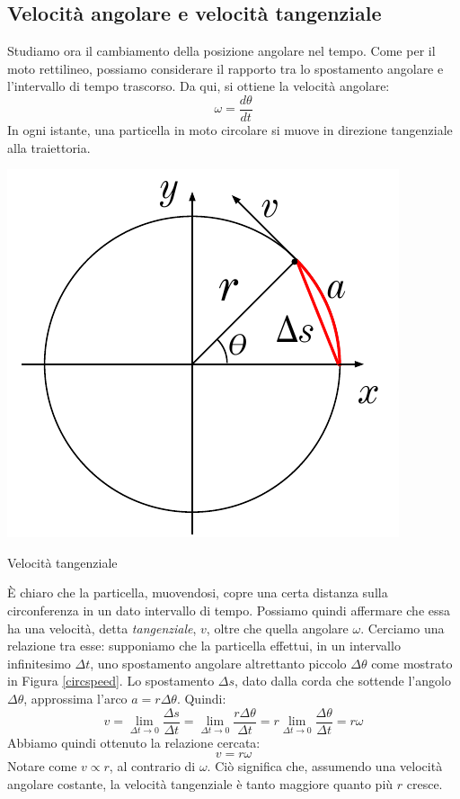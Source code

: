 \subsection{Velocità angolare e velocità tangenziale}
Studiamo ora il cambiamento della posizione angolare nel tempo. Come per il
moto rettilineo, possiamo considerare il rapporto tra lo spostamento angolare
e l'intervallo di tempo trascorso. Da qui, si ottiene la velocità angolare:
\[ \omega = \frac{d\theta}{dt} \]
In ogni istante, una particella in moto circolare si muove in direzione
tangenziale alla traiettoria.
\begin{marginfigure}
    \centering
    \includegraphics[width = \marginparwidth]{figures/circspeed.pdf}
    \caption{Velocità tangenziale}
    \label{circspeed}
\end{marginfigure}
È chiaro che la particella, muovendosi, copre una certa distanza sulla
circonferenza in un dato intervallo di tempo. Possiamo quindi affermare
che essa ha una velocità, detta \textit{tangenziale}, $v$, oltre che
quella angolare $\omega$. Cerciamo una relazione tra esse: supponiamo che
la particella effettui, in un intervallo infinitesimo $\Delta t$, uno
spostamento angolare altrettanto piccolo $\Delta\theta$ come mostrato in
Figura \ref{circspeed}. Lo spostamento $\Delta s$, dato dalla corda che
sottende l'angolo $\Delta\theta$, approssima l'arco $a = r\Delta\theta$. Quindi:
\[ v = \lim_{\Delta t \to 0}\frac{\Delta s}{\Delta t} = \lim_{\Delta t \to 0} \frac{r\Delta\theta}{\Delta t} = r\lim_{\Delta t \to 0}\frac{\Delta\theta}{\Delta t} = r\omega \]
Abbiamo quindi ottenuto la relazione cercata:
\[ v = r\omega \]
Notare come $v\propto r$, al contrario di $\omega$. Ciò significa che,
assumendo una velocità angolare costante, la velocità tangenziale è tanto
maggiore quanto più $r$ cresce.

